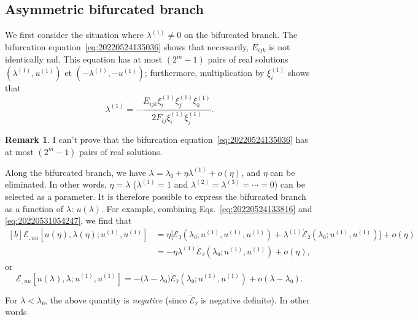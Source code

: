 \documentclass[12pt, final]{scrartcl}
\theoremstyle{definition}
\newtheorem{remark}{Remark}
\newcommand{\E}{\mathcal E}
\newcommand{\order}[2][1]{#2^{(#1)}}
\begin{document}
\subsection{Asymmetric bifurcated branch}

We first consider the situation where $\order[1]\lambda ≠ 0$ on the bifurcated
branch. The bifurcation equation~\eqref{eq:20220524135036} shows that
necessarily, $E_{ijk}$ is not identically nul. This equation has at most
$(2^m - 1)$ pairs of real solutions $(\order[1]\lambda, \order[1]u)$ et
$(- \order[1]\lambda, - \order[1]u)$; furthermore, multiplication by
$\order[1]{ξ_i}$ shows that
\begin{equation}
  \label{eq:20220801085236}
  \order[1]\lambda = -\frac{E_{ijk} \order[1]{ξ_i} \order[1]{ξ_j} \order[1]{ξ_k}}{2 F_{ij} \order[1]{ξ_i} \order[1]{ξ_j}}.
\end{equation}

\begin{remark}
  I can't prove that the bifurcation equation~\eqref{eq:20220524135036} has at
  most $(2^m - 1)$ pairs of real solutions.
\end{remark}

Along the bifurcated branch, we have $\lambda = \lambda₀ + η \order[1]\lambda + o(η)$, and $η$ can be
eliminated. In other words, $η=\lambda$ ($\order[1]\lambda=1$ and $\order[2]\lambda = \order[3]\lambda = \cdots = 0$) can
be selected as a parameter. It is therefore possible to express the bifurcated
branch as a function of $\lambda$: $u(\lambda)$. For example, combining
Eqs.~\eqref{eq:20220524133816} and \eqref{eq:20220531054247}, we find that
\begin{equation}
  \begin{aligned}[b]
    \E_{, uu}[u(η), \lambda(η); \order[1]u, \order[1]u]
    &= η \bigl[\E₃(\lambda₀ ; \order[1]u, \order[1]u, \order[1]u)  + \order[1]\lambda \dot{\E}₂(\lambda₀; \order[1]u, \order[1]u)\bigr] + o(η)\\
    &= - η \order[1]\lambda \dot{\E}₂(\lambda₀; \order[1]u, \order[1]u) + o(η),
  \end{aligned}
\end{equation}
or
\begin{equation}
  \label{eq:20220819160235}
  \E_{, uu}[u(\lambda), \lambda; \order[1]u, \order[1]u] = -\bigl( \lambda - \lambda₀ \bigr) \dot{\E}₂(\lambda₀; \order[1]u, \order[1]u) + o(\lambda - \lambda₀).
\end{equation}

For $\lambda < \lambda₀$, the above quantity is \emph{negative} (since $\dot{\E}₂$ is
negative definite). In other words
\end{document}

